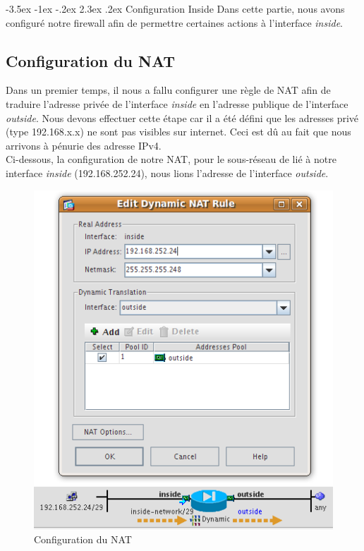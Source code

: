 \documentclass[a4paper,12pt]{article}
\makeatletter
\renewcommand\section{\@startsection {section}{1}{\z@}%
                           {-3.5ex \@plus -1ex \@minus -.2ex}%
                           {2.3ex \@plus.2ex}%
                           {\normalfont\Large\bfseries}}
\makeatother
\begin{document}
\section{Configuration Inside}
Dans cette partie, nous avons configuré notre firewall afin de permettre certaines actions à l'interface \textit{inside}.

\subsection{Configuration du NAT}
Dans un premier temps, il nous a fallu configurer une règle de NAT afin de traduire l'adresse privée de l'interface \textit{inside} en l'adresse publique de l'interface \textit{outside}. Nous devons effectuer cette étape car il a été défini que les adresses privé (type 192.168.x.x) ne sont pas visibles sur internet. Ceci est dû au fait que nous arrivons à pénurie des adresse IPv4.\\
Ci-dessous, la configuration de notre NAT, pour le sous-réseau de lié à notre interface \textit{inside} (192.168.252.24), nous lions l'adresse de l'interface \textit{outside}.
\begin{figure}[H]
	\center
	\includegraphics[width=13cm]{img/3-ConfigurationduNAT.png}
	\caption{Configuration du NAT}
\end{figure}
\end{document}
